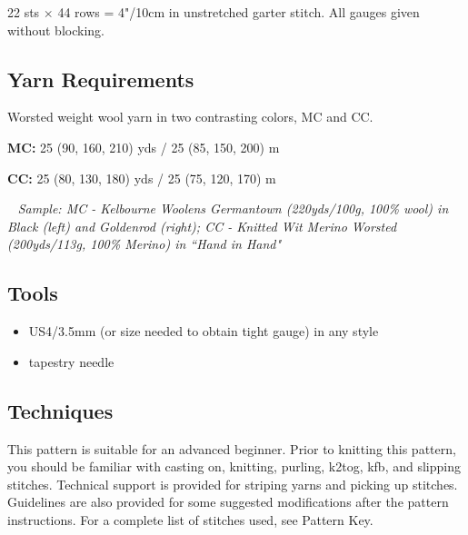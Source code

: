 \documentclass[12pt]{article}
\newcommand{\rowDir}[1]{\textbf{#1:}} %
\begin{document}
\begin{titlingpage}
\begin{multicols}{2}
22 sts $\times$ 44 rows = 4"/10cm in unstretched garter stitch. All gauges given without blocking.

\subsection*{Yarn Requirements}

Worsted weight wool yarn in two contrasting colors, MC and CC.

\rowDir{MC} 25 (90, 160, 210) yds / 25 (85, 150, 200) m  %

\rowDir{CC} 25 (80, 130, 180) yds / 25 (75, 120, 170) m  %

~\vfill
\columnbreak
\scriptsize
\emph{Sample: MC - Kelbourne Woolens Germantown (220yds/100g, 100\% wool) in Black (left) and Goldenrod (right); CC - Knitted Wit Merino Worsted (200yds/113g, 100\% Merino) in ``Hand in Hand"}

\small
\subsection*{Tools}

\begin{itemize}
\item US4/3.5mm (or size needed to obtain tight gauge) in any style
\item tapestry needle
\end{itemize}

\subsection*{Techniques}

This pattern is suitable for an advanced beginner. %
Prior to knitting this pattern, you should be familiar with casting on, knitting, purling, k2tog, kfb, and slipping stitches. %
Technical support is provided for striping yarns and picking up stitches. Guidelines are also provided for some suggested modifications after the pattern instructions.
For a complete list of stitches used, see Pattern Key.


~\vfill
\newpage



\end{multicols}
\end{titlingpage}
\end{document}
